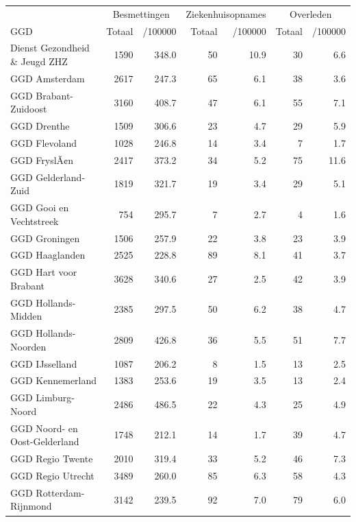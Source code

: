 \documentclass[
  english,
  man,floatsintext]{apa6}
\begin{document}
\begin{table}[H]
\centering\begingroup\fontsize{10}{12}\selectfont

\begin{threeparttable}
\begin{tabular}{lrrrrrr}
\toprule
\multicolumn{1}{c}{ } & \multicolumn{2}{c}{Besmettingen} & \multicolumn{2}{c}{Ziekenhuisopnames} & \multicolumn{2}{c}{Overleden} \\
\cmidrule(l{3pt}r{3pt}){2-3} \cmidrule(l{3pt}r{3pt}){4-5} \cmidrule(l{3pt}r{3pt}){6-7}
GGD & Totaal & /100000 & Totaal & /100000 & Totaal & /100000\\
\midrule
Dienst Gezondheid \& Jeugd ZHZ & 1590 & 348.0 & 50 & 10.9 & 30 & 6.6\\
GGD Amsterdam & 2617 & 247.3 & 65 & 6.1 & 38 & 3.6\\
GGD Brabant-Zuidoost & 3160 & 408.7 & 47 & 6.1 & 55 & 7.1\\
GGD Drenthe & 1509 & 306.6 & 23 & 4.7 & 29 & 5.9\\
GGD Flevoland & 1028 & 246.8 & 14 & 3.4 & 7 & 1.7\\
GGD FryslÃ¢n & 2417 & 373.2 & 34 & 5.2 & 75 & 11.6\\
GGD Gelderland-Zuid & 1819 & 321.7 & 19 & 3.4 & 29 & 5.1\\
GGD Gooi en Vechtstreek & 754 & 295.7 & 7 & 2.7 & 4 & 1.6\\
GGD Groningen & 1506 & 257.9 & 22 & 3.8 & 23 & 3.9\\
GGD Haaglanden & 2525 & 228.8 & 89 & 8.1 & 41 & 3.7\\
GGD Hart voor Brabant & 3628 & 340.6 & 27 & 2.5 & 42 & 3.9\\
GGD Hollands-Midden & 2385 & 297.5 & 50 & 6.2 & 38 & 4.7\\
GGD Hollands-Noorden & 2809 & 426.8 & 36 & 5.5 & 51 & 7.7\\
GGD IJsselland & 1087 & 206.2 & 8 & 1.5 & 13 & 2.5\\
GGD Kennemerland & 1383 & 253.6 & 19 & 3.5 & 13 & 2.4\\
GGD Limburg-Noord & 2486 & 486.5 & 22 & 4.3 & 25 & 4.9\\
GGD Noord- en Oost-Gelderland & 1748 & 212.1 & 14 & 1.7 & 39 & 4.7\\
GGD Regio Twente & 2010 & 319.4 & 33 & 5.2 & 46 & 7.3\\
GGD Regio Utrecht & 3489 & 260.0 & 85 & 6.3 & 58 & 4.3\\
GGD Rotterdam-Rijnmond & 3142 & 239.5 & 92 & 7.0 & 79 & 6.0\\

\end{tabular}
\end{threeparttable}
\end{table}
\end{document}
